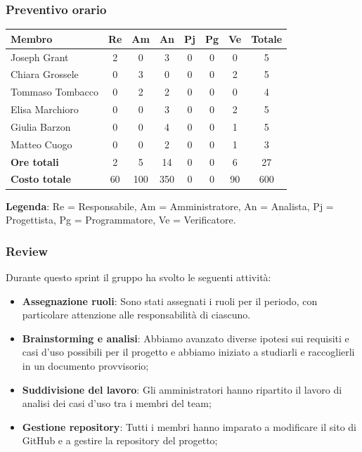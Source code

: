 \documentclass[11pt,a4paper]{article}
\begin{document}
\subsubsection{Preventivo orario}
\begin{center}
    \begin{tabular}{|l|c|c|c|c|c|c|c|}
        \hline
        \textbf{Membro} & \textbf{Re} & \textbf{Am} & \textbf{An} & \textbf{Pj} & \textbf{Pg} & \textbf{Ve} & \textbf{Totale} \\
        \hline
        Joseph Grant & 2 & 0 & 3 & 0 & 0 & 0 & 5 \\
        \hline
        Chiara Grossele & 0 & 3 & 0 & 0 & 0 & 2 & 5 \\
        \hline
        Tommaso Tombacco & 0 & 2 & 2 & 0 & 0 & 0 & 4 \\
        \hline
        Elisa Marchioro & 0 & 0 & 3 & 0 & 0 & 2 & 5 \\
        \hline
        Giulia Barzon & 0 & 0 & 4 & 0 & 0 & 1 & 5 \\
        \hline
        Matteo Cuogo & 0 & 0 & 2 & 0 & 0 & 1 & 3 \\
        \hline
        \textbf{Ore totali} & 2 & 5 & 14 & 0 & 0 & 6 & 27 \\
        \hline
        \textbf{Costo totale} & 60 & 100 & 350 & 0 & 0 & 90 & 600 \\
        \hline
    \end{tabular}
\end{center}

\noindent \textbf{Legenda}: Re = Responsabile, Am = Amministratore, An = Analista, Pj = Progettista, Pg = Programmatore, Ve = Verificatore.

\subsubsection{Review}
Durante questo sprint il gruppo ha svolto le seguenti attività:
\begin{itemize}
    \item \textbf{Assegnazione ruoli}: Sono stati assegnati i ruoli per il periodo, con particolare attenzione alle responsabilità di ciascuno.
    \item \textbf{Brainstorming e analisi}: Abbiamo avanzato diverse ipotesi sui requisiti e casi d'uso possibili per il progetto e abbiamo iniziato a studiarli e raccoglierli in un documento provvisorio;
    \item \textbf{Suddivisione del lavoro}: Gli amministratori hanno ripartito il lavoro di analisi dei casi d'uso tra i membri del team;
    \item \textbf{Gestione repository}: Tutti i membri hanno imparato a modificare il sito di GitHub e a gestire la repository del progetto;
\end{itemize}
\end{document}
